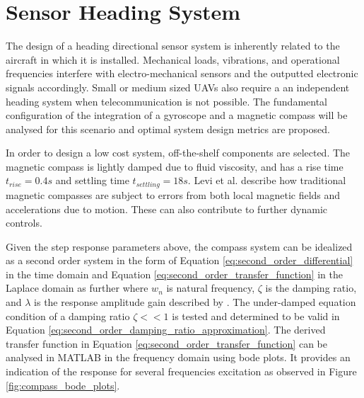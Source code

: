 \section{Sensor Heading System}

The design of a heading directional sensor system is inherently related to the aircraft in which it is installed. Mechanical loads, vibrations, and operational frequencies interfere with electro-mechanical sensors and the outputted electronic signals accordingly. Small or medium sized UAVs also require a an independent heading system when telecommunication is not possible. The fundamental configuration of the integration of a gyroscope and a magnetic compass will be analysed for this scenario and optimal system design metrics are proposed. 

In order to design a low cost system, off-the-shelf components are selected. The magnetic compass is lightly damped due to fluid viscosity, and has a rise time $t_{rise} = 0.4s$ and settling time $t_{settling} = 18s$. Levi et al. \cite{levi2005gyro} describe how traditional magnetic compasses are subject to errors from both local magnetic fields and accelerations due to motion. These can also contribute to further dynamic controls.


Given the step response parameters above, the compass system can be idealized as a second order system in the form of Equation \ref{eq:second_order_differential} in the time domain and Equation \ref{eq:second_order_transfer_function} in the Laplace domain as further where $w_n$ is natural frequency, $\zeta$ is the damping ratio, and $\lambda$ is the response amplitude gain described by \cite{ogata2010modern}. The under-damped equation condition of a damping ratio $\zeta << 1$ is tested and determined to be valid in Equation \ref{eq:second_order_damping_ratio_approximation}. The derived transfer function in Equation \ref{eq:second_order_transfer_function} can be analysed in MATLAB in the frequency domain using bode plots. It provides an indication of the response for several frequencies excitation as observed in Figure \ref{fig:compass_bode_plots}.

